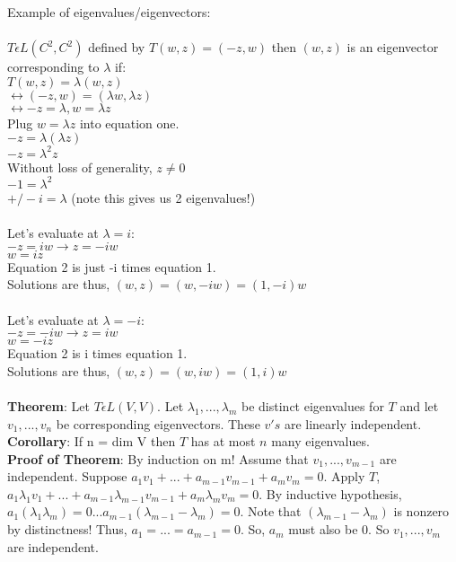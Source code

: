 \documentclass{article}
\begin{document}
Example of eigenvalues/eigenvectors: \\\\
$T \epsilon L(C^2, C^2)$ defined by $T(w,z) = (-z, w)$ then $(w,z)$ is an eigenvector corresponding to $\lambda$ if: \\
$T(w,z) = \lambda(w,z)$\\
$\leftrightarrow (-z,w) = (\lambda w, \lambda z)$\\
$\leftrightarrow -z = \lambda, w = \lambda z$ \\
Plug $w = \lambda z$ into equation one. \\
$-z = \lambda(\lambda z)$\\
$-z = \lambda^2 z$\\
Without loss of generality, $z \neq 0$\\
$-1 = \lambda^2$\\
$+/- i = \lambda$ (note this gives us 2 eigenvalues!)\\\\
Let's evaluate at $\lambda = i$: \\
$-z = iw \rightarrow z = -iw$ \\
$w = iz$\\
Equation 2 is just -i times equation 1. \\ Solutions are thus, $(w,z) = (w, -iw) = (1, -i)w$\\\\
Let's evaluate at $\lambda = -i$:\\
$-z = -iw \rightarrow z = iw$\\
$w = -iz$\\
Equation 2 is i times equation 1. \\
Solutions are thus, $(w,z) = (w, iw) = (1, i)w$\\\\
\textbf{Theorem}: Let $T \epsilon L(V,V).$ Let $\lambda_1, ..., \lambda_m$ be distinct eigenvalues for $T$ and let $v_1,..., v_n$ be corresponding eigenvectors. These $v's$ are linearly independent. \\
\textbf{Corollary}: If n = dim V then $T$ has at most $n$ many eigenvalues. \\
\textbf{Proof of Theorem}: By induction on m! Assume that $v_1,..., v_{m-1}$ are independent. Suppose $a_1v_1 + ... + a_{m-1}v_{m-1}+a_mv_m = 0$. Apply $T$, $a_1\lambda_1v_1 + ... + a_{m-1}\lambda_{m-1}v_{m-1}+a_m\lambda_mv_m = 0$. By inductive hypothesis, $a_1(\lambda_1 \lambda_m)=0 ... a_{m-1}(\lambda_{m-1}-\lambda_m)=0$. Note that $(\lambda_{m-1}-\lambda_m)$ is nonzero by distinctness! Thus, $a_1 = ... = a_{m-1} = 0$. So, $a_m$ must also be $0$. So $v_1,..., v_m$ are independent. 
\end{document}
